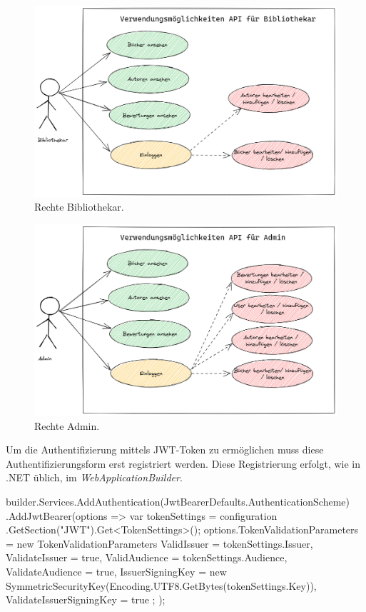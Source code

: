 \begin{figure}[H]
    \includegraphics[width=\textwidth]{pics/UseCaseLibrarian.png}
    \caption{Rechte Bibliothekar.}
\end{figure}

\begin{figure}[H]
    \includegraphics[width=\textwidth]{pics/UseCaseAdmin.png}
    \caption{Rechte Admin.}
\end{figure}

Um die Authentifizierung mittels JWT-Token zu ermöglichen muss diese Authentifizierungsform erst registriert werden.
Diese Registrierung erfolgt, wie in .NET üblich, im \textit{WebApplicationBuilder}.

\begin{JsCode}
builder.Services.AddAuthentication(JwtBearerDefaults.AuthenticationScheme)
    .AddJwtBearer(options => {
        var tokenSettings = configuration
        .GetSection("JWT").Get<TokenSettings>();
        options.TokenValidationParameters = new TokenValidationParameters {
            ValidIssuer = tokenSettings.Issuer,
            ValidateIssuer = true,
            ValidAudience = tokenSettings.Audience,
            ValidateAudience = true,
            IssuerSigningKey = new SymmetricSecurityKey(Encoding.UTF8.GetBytes(tokenSettings.Key)),
            ValidateIssuerSigningKey = true
        };
    });
\end{JsCode}

